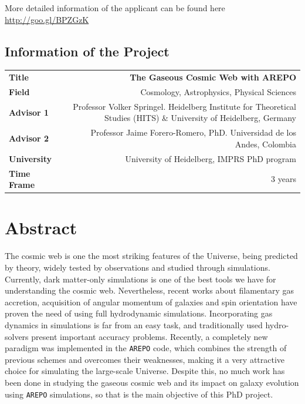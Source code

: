 \documentclass[a4,useAMS,usenatbib,usegraphicx,12pt]{article}
\begin{document}
\vspace{10pt}

More detailed information of the applicant can be found here \url{http://goo.gl/BPZGzK}

\vspace{15pt}  

\subsection*{Information of the Project}
\begin{tabular}{L!{\VRule}R}
\bf Title		& \bf The Gaseous Cosmic Web with AREPO\\
\bf Field		& Cosmology, Astrophysics, Physical Sciences \\
\bf Advisor 1	& Professor Volker Springel. Heidelberg Institute for Theoretical Studies (HITS) 
\& University of Heidelberg, Germany \\
\bf Advisor 2	& Professor Jaime Forero-Romero, PhD. Universidad de los Andes, Colombia \\
\bf University	& University of Heidelberg, IMPRS PhD program \\
\bf Time Frame	& 3 years \\
\end{tabular}
\normalsize


\section{Abstract}


The cosmic web is one the most striking features of the Universe, being 
predicted by theory, widely tested by observations and studied through 
simulations. Currently, dark matter-only simulations is one of the best tools 
we have for understanding the cosmic web. Nevertheless, recent works about 
filamentary gas accretion, acquisition of angular momentum of galaxies and spin 
orientation have proven the need of using full hydrodynamic simulations. 
Incorporating gas dynamics in simulations is far from an easy task, and 
traditionally used hydro-solvers present important accuracy problems. Recently, 
a completely new paradigm was implemented in the \texttt{AREPO} code, which 
combines the strength of previous schemes and overcomes their weaknesses, making
it a very attractive choice for simulating the large-scale Universe. Despite 
this, no much work has been done in studying the gaseous cosmic web and its 
impact on galaxy evolution using \texttt{AREPO} simulations, so that is the 
main objective of this PhD project.
\end{document}
